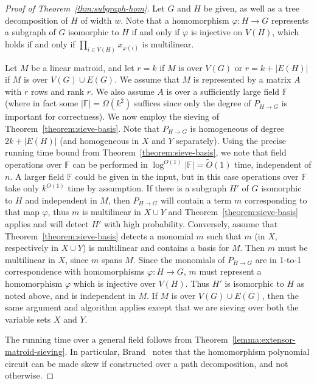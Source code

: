 \documentclass{theoretics}
\newcommand{\F}{\ensuremath{\mathbb F}\xspace}
\begin{document}
\begin{proof}[Proof of Theorem~\ref{thm:subgraph-hom}]
  Let $G$ and $H$ be given, as well as a tree decomposition of $H$ of
  width $w$. Note that a homomorphism $\varphi \colon H \to G$
  represents a subgraph of $G$ isomorphic to $H$ if and only if
  $\varphi$ is injective on $V(H)$, which holds if and only if
  $\prod_{i \in V(H)} x_{\varphi(i)}$ is multilinear. 
  
  Let $M$ be a linear matroid, and let $r=k$ if $M$ is over
  $V(G)$ or 
  $r=k+|E(H)|$ if $M$ is over $V(G) \cup E(G)$. We assume that $M$ is represented by a matrix
  $A$ with $r$ rows and rank $r$. We also assume $A$ is over a
  sufficiently large field $\F$ (where in fact some $|\F|=\Omega(k^2)$ suffices
  since only the degree of $P_{H \to G}$ is important for correctness).
  We now employ the sieving of Theorem~\ref{theorem:sieve-basis}.
  Note that $P_{H \to G}$ is homogeneous of degree $2k+|E(H)|$
  (and homogeneous in $X$ and $Y$ separately). Using the precise
  running time bound from Theorem~\ref{theorem:sieve-basis},
  we note that field operations over $\F$ can be performed
  in $\log^{O(1)} |\F|=\tilde O(1)$ time, independent of $n$.
  A larger field $\F$ could be given in the input, but in this case
  operations over $\F$ take only $k^{O(1)}$ time by assumption.
  If there is a subgraph $H'$ of $G$ isomorphic to $H$ and independent
  in $M$, then $P_{H \to G}$ will contain a term $m$ corresponding to that
  map $\varphi$, thus $m$ is multilinear in $X \cup Y$ and
  Theorem~\ref{theorem:sieve-basis} applies and will detect $H'$ with
  high probability. Conversely, assume that Theorem~\ref{theorem:sieve-basis}
  detects a monomial $m$ such that $m$ (in $X$, respectively in $X \cup Y$)
  is multilinear and contains a basis for $M$. Then $m$ must be
  multilinear in $X$, since $m$ spans $M$. Since the monomials of
  $P_{H \to G}$ are in 1-to-1 correspondence with homomorphisms
  $\varphi \colon H \to G$, $m$ must represent a homomorphism $\varphi$
  which is injective over $V(H)$. Thus $H'$ is isomorphic to $H$ as
  noted above, and is independent in $M$. If $M$ is over $V(G) \cup E(G)$,
  then the same argument and algorithm applies except that we are
  sieving over both the variable sets $X$ and $Y$. 

  The running time over a general field follows from
  Theorem~\ref{lemma:extensor-matroid-sieving}. In particular, Brand~\cite{Brand19thesis}
  notes that the homomorphism polynomial circuit can be made skew if
  constructed over a path decomposition, and not otherwise.
\end{proof}
\end{document}
